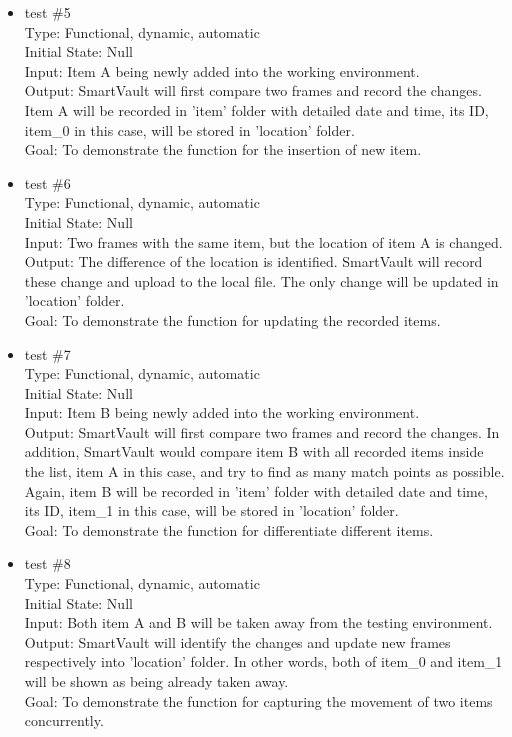 \documentclass[12pt, titlepage]{article}
\begin{document}
\begin{itemize}
\item{test \#5\\}
Type: Functional, dynamic, automatic\\
Initial State: Null\\
Input: Item A being newly added into the working environment.\\
Output: SmartVault will first compare two frames and record the changes. Item A will be recorded in 'item' folder with detailed date and time, its ID, item\_0 in this case, will be stored in 'location' folder.\\ 
Goal: To demonstrate the function for the insertion of new item.\\
\item{test \#6\\}
Type: Functional, dynamic, automatic\\
Initial State: Null\\
Input: Two frames with the same item, but the location of item A is changed.\\
Output: The difference of the location is identified. SmartVault will record these change and upload to the local file. The only change will be updated in 'location' folder.\\ 
Goal: To demonstrate the function for updating the recorded items.\\
\item{test \#7\\}
Type: Functional, dynamic, automatic\\
Initial State: Null\\
Input: Item B being newly added into the working environment.\\
Output: SmartVault will first compare two frames and record the changes. In addition, SmartVault would compare item B with all recorded items inside the list, item A in this case, and try to find as many match points as possible. Again, item B will be recorded in 'item' folder with detailed date and time, its ID, item\_1 in this case, will be stored in 'location' folder.\\ 
Goal: To demonstrate the function for differentiate different items.\\
\item{test \#8\\}
Type: Functional, dynamic, automatic\\
Initial State: Null\\
Input: Both item A and B will be taken away from the testing environment.\\
Output: SmartVault will identify the changes and update new frames respectively into 'location' folder. In other words, both of item\_0 and item\_1 will be shown as being already taken away.\\
Goal: To demonstrate the function for capturing the movement of two items concurrently.\\
\end{itemize}
\end{document}
